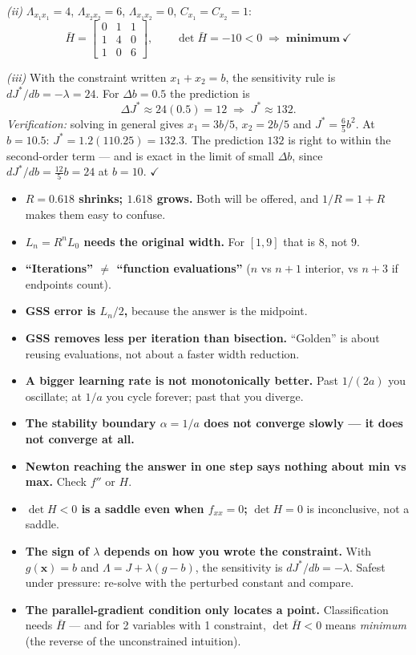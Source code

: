 \begin{probbox}
\emph{(ii)} $\Lambda_{x_1x_1} = 4$, $\Lambda_{x_2x_2} = 6$, $\Lambda_{x_1x_2} = 0$, $C_{x_1} = C_{x_2} = 1$:
\[
\bar H = \begin{bmatrix}0&1&1\\1&4&0\\1&0&6\end{bmatrix}, \qquad \det\bar H = -10 < 0 \;\Rightarrow\; \textbf{minimum}\ \checkmark
\]

\emph{(iii)} With the constraint written $x_1+x_2 = b$, the sensitivity rule is $dJ^\ast/db = -\lambda = 24$. For $\Delta b = 0.5$ the prediction is
\[
\Delta J^\ast \approx 24(0.5) = 12 \;\Longrightarrow\; J^\ast \approx 132 .
\]
\emph{Verification:} solving in general gives $x_1 = 3b/5$, $x_2 = 2b/5$ and $J^\ast = \tfrac65 b^2$. At $b = 10.5$: $J^\ast = 1.2(110.25) = 132.3$. The prediction $132$ is right to within the second-order term --- and is exact in the limit of small $\Delta b$, since $dJ^\ast/db = \tfrac{12}{5}b = 24$ at $b=10$. $\checkmark$
\end{probbox}

\begin{trapbox}
\begin{itemize}
\item \textbf{$R = 0.618$ shrinks; $1.618$ grows.} Both will be offered, and $1/R = 1+R$ makes them easy to confuse.
\item \textbf{$L_n = R^nL_0$ needs the original width.} For $[1,9]$ that is $8$, not $9$.
\item \textbf{``Iterations'' $\ne$ ``function evaluations''} ($n$ vs $n+1$ interior, vs $n+3$ if endpoints count).
\item \textbf{GSS error is $L_n/2$,} because the answer is the midpoint.
\item \textbf{GSS removes less per iteration than bisection.} ``Golden'' is about reusing evaluations, not about a faster width reduction.
\item \textbf{A bigger learning rate is not monotonically better.} Past $1/(2a)$ you oscillate; at $1/a$ you cycle forever; past that you diverge.
\item \textbf{The stability boundary $\alpha = 1/a$ does not converge slowly --- it does not converge at all.}
\item \textbf{Newton reaching the answer in one step says nothing about min vs max.} Check $f''$ or $H$.
\item \textbf{$\det H<0$ is a saddle even when $f_{xx} = 0$;} $\det H = 0$ is inconclusive, not a saddle.
\item \textbf{The sign of $\lambda$ depends on how you wrote the constraint.} With $g(\mathbf x) = b$ and $\Lambda = J+\lambda(g-b)$, the sensitivity is $dJ^\ast/db = -\lambda$. Safest under pressure: re-solve with the perturbed constant and compare.
\item \textbf{The parallel-gradient condition only locates a point.} Classification needs $\bar H$ --- and for 2 variables with 1 constraint, $\det\bar H<0$ means \emph{minimum} (the reverse of the unconstrained intuition).
\end{itemize}
\end{trapbox}

